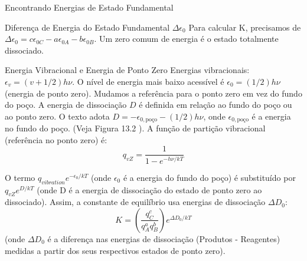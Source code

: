 \documentclass{beamer}
\begin{document}
\begin{frame}{Encontrando Energias de Estado Fundamental}
    \begin{block}{Diferença de Energia do Estado Fundamental $\Delta\epsilon_0$}
        Para calcular K, precisamos de $\Delta\epsilon_0 = c\epsilon_{0C} - a\epsilon_{0A} - b\epsilon_{0B}$. 
        Um zero comum de energia é o estado totalmente dissociado.  
    \end{block}
    \begin{block}{Energia Vibracional e Energia de Ponto Zero}
        Energias vibracionais: $\epsilon_v = (v + 1/2)h\nu$.  O nível de energia mais baixo acessível é $\epsilon_0 = (1/2)h\nu$ (energia de ponto zero).  
        Mudamos a referência para o ponto zero em vez do fundo do poço. 
        A energia de dissociação $D$ é definida em relação ao fundo do poço ou ao ponto zero. O texto adota $D = -\epsilon_{0,\text{poço}} - (1/2)h\nu$, onde $\epsilon_{0,\text{poço}}$ é a energia no fundo do poço. (Veja Figura 13.2 ).
        A função de partição vibracional (referência no ponto zero) é:
        $$ q_{vZ} = \frac{1}{1 - e^{-h\nu/kT}} $$
         
        O termo $q_{vibration} e^{-\epsilon_0/kT}$ (onde $\epsilon_0$ é a energia do fundo do poço) é substituído por $q_{vZ} e^{D/kT}$ (onde D é a energia de dissociação do estado de ponto zero ao dissociado). 
        Assim, a constante de equilíbrio usa energias de dissociação $\Delta D_0$:
        $$ K = \left(\frac{q_C^c}{q_A^a q_B^b}\right) e^{\Delta D_0/kT} $$
        (onde $\Delta D_0$ é a diferença nas energias de dissociação (Produtos - Reagentes) medidas a partir dos seus respectivos estados de ponto zero).
    \end{block}
\end{frame}
\end{document}
